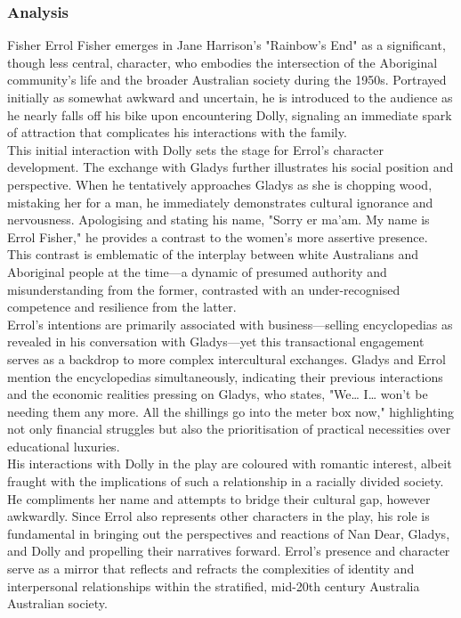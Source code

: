 \documentclass[a4paper]{article}
\begin{document}
\subsubsection{Analysis}
Fisher
Errol Fisher emerges in Jane Harrison's "Rainbow's End" as a significant, though less central, 
character, who embodies the intersection of the Aboriginal community's life and the broader 
Australian society during the 1950s. Portrayed initially as somewhat awkward and uncertain, he is 
introduced to the audience as he nearly falls off his bike upon encountering Dolly, signaling an 
immediate spark of attraction that complicates his interactions with the family.\\

This initial interaction with Dolly sets the stage for Errol's character development. The exchange 
with Gladys further illustrates his social position and perspective. When he tentatively approaches 
Gladys as she is chopping wood, mistaking her for a man, he immediately demonstrates cultural 
ignorance and nervousness. Apologising and stating his name, "Sorry er ma’am. My name is Errol 
Fisher," he provides a contrast to the women's more assertive presence. This contrast is emblematic 
of the interplay between white Australians and Aboriginal people at the time—a dynamic of presumed 
authority and misunderstanding from the former, contrasted with an under-recognised competence and 
resilience from the latter.\\

Errol's intentions are primarily associated with business—selling encyclopedias as revealed in his 
conversation with Gladys—yet this transactional engagement serves as a backdrop to more complex 
intercultural exchanges. Gladys and Errol mention the encyclopedias simultaneously, indicating 
their previous interactions and the economic realities pressing on Gladys, who states, "We… I… 
won’t be needing them any more. All the shillings go into the meter box now," highlighting not only 
financial struggles but also the prioritisation of practical
necessities over educational luxuries.\\

His interactions with Dolly in the play are coloured with romantic interest, albeit fraught with 
the implications of such a relationship in a racially divided society. He compliments her name and 
attempts to bridge their cultural gap, however awkwardly. Since Errol also represents other 
characters in the play, his role is fundamental in bringing out the perspectives and reactions of 
Nan Dear, Gladys, and Dolly and propelling their narratives forward. Errol's presence and character 
serve as a mirror that reflects and refracts the complexities of identity and interpersonal 
relationships within the stratified, mid-20th
century Australia Australian society.
\end{document}
